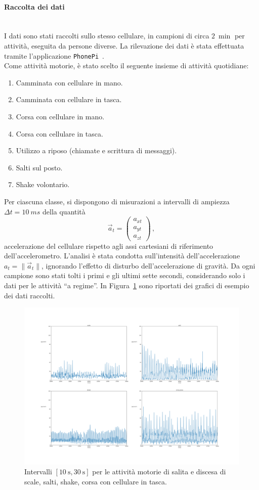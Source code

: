 \documentclass[./main.tex]{subfiles}
\begin{document}
\paragraph{Raccolta dei dati}\mbox{}\\
I dati sono stati raccolti sullo stesso cellulare, in campioni di circa $\SI{2}{\min}$ per attività, eseguita da persone diverse. La rilevazione dei dati è stata effettuata tramite l'applicazione \texttt{PhonePi}~\cite{kumar2019}.\\
Come attività motorie, è stato scelto il seguente insieme di attività quotidiane:
\begin{enumerate}
	\item Camminata con cellulare in mano.
	\item Camminata con cellulare in tasca.
	\item Corsa con cellulare in mano.
	\item Corsa con cellulare in tasca.
	\item Utilizzo a riposo (chiamate e scrittura di messaggi).
	\item Salti sul posto.
	\item Shake volontario.
\end{enumerate}
Per ciascuna classe, si dispongono di misurazioni a intervalli di ampiezza $\Delta t = \SI{10}{ms}$ della quantità
$$
\vec{a}_t = \begin{pmatrix}
a_{xt}\\
a_{yt}\\
a_{zt}
\end{pmatrix}\,,
$$
accelerazione del cellulare rispetto agli assi cartesiani di riferimento dell'accelerometro. L'analisi è stata condotta sull'intensità dell'accelerazione $a_t = \|\vec{a}_t\|$, ignorando l'effetto di disturbo dell'accelerazione di gravità. Da ogni campione sono stati tolti i primi e gli ultimi sette secondi, considerando solo i dati per le attività ``a regime''.
In Figura~\ref{fig:esempio} sono riportati dei grafici di esempio dei dati raccolti.
\begin{figure}[H]
	\label{fig:esempio}
	\centering
	\includegraphics[width=.8\textwidth, keepaspectratio]{../../figure/espl.png}
	\caption{Intervalli $ [\SI{10}{\second}, \SI{30}{\second}] $ per le attività motorie di salita e discesa di scale, salti, shake, corsa con cellulare in tasca.}
\end{figure}
\end{document}
